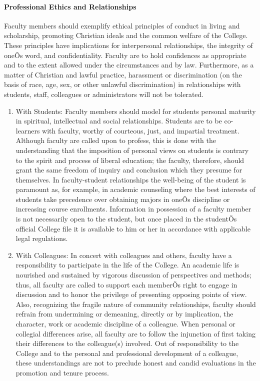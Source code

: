 \documentclass[letterpaper, 11pt]{article}
\begin{document}
			\paragraph{Professional Ethics and Relationships}
				Faculty members should exemplify ethical principles of conduct in living and scholarship, promoting Christian ideals and the common welfare of the College.  These principles have implications for interpersonal relationships, the integrity of oneÕs word, and confidentiality.  Faculty are to hold confidences as appropriate and to the extent allowed under the circumstances and by law.  Furthermore, as a matter of Christian and lawful practice, harassment or discrimination (on the basis of race, age, sex, or other unlawful discrimination) in relationships with students, staff, colleagues or administrators will not be tolerated.
				\begin{enumerate}[label=\alph*)]
					\item{With Students:  Faculty members should model for students personal maturity in spiritual, intellectual and social relationships.  Students are to be co-learners with faculty, worthy of courteous, just, and impartial treatment.  Although faculty are called upon to profess, this is done with the understanding that the imposition of personal views on students is contrary to the spirit and process of liberal education; the faculty, therefore, should grant the same freedom of inquiry and conclusion which they presume for themselves.  In faculty-student relationships the well-being of the student is paramount as, for example, in academic counseling where the best interests of students take precedence over obtaining majors in oneÕs discipline or increasing course enrollments.  Information in possession of a faculty member is not necessarily open to the student, but once placed in the studentÕs official College file it is available to him or her in accordance with applicable legal regulations.}
					\item{With Colleagues:  In concert with colleagues and others, faculty have a responsibility to participate in the life of the College.  An academic life is nourished and sustained by vigorous discussion of perspectives and methods; thus, all faculty are called to support each memberÕs right to engage in discussion and to honor the privilege of presenting opposing points of view.  Also, recognizing the fragile nature of community relationships, faculty should refrain from undermining or demeaning, directly or by implication, the character, work or academic discipline of a colleague. When personal or collegial differences arise, all faculty are to follow the injunction of first taking their differences to the colleague(s) involved.  Out of responsibility to the College and to the personal and professional development of a colleague, these understandings are not to preclude honest and candid evaluations in the promotion and tenure process.}

\end{enumerate}
\end{document}
